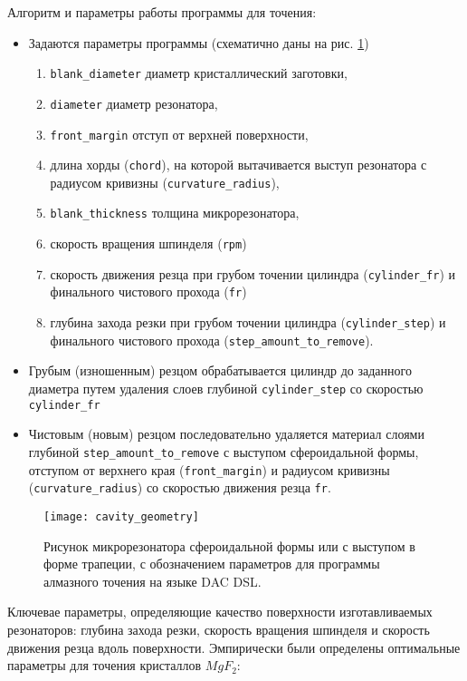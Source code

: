 Алгоритм и параметры работы программы для точения:
\begin{itemize}
  \item Задаются параметры программы (схематично даны на рис. \ref{cavity_scheme})
  \begin{enumerate}
    \item \texttt{blank\_diameter} диаметр кристаллический заготовки,
    \item \texttt{diameter} диаметр резонатора,
    \item \texttt{front\_margin} отступ от верхней поверхности,
    \item длина хорды (\texttt{chord}), на которой вытачивается выступ резонатора с радиусом кривизны (\texttt{curvature\_radius}),
    \item \texttt{blank\_thickness} толщина микрорезонатора,
    \item скорость вращения шпинделя (\texttt{rpm})
    \item скорость движения резца при грубом точении цилиндра (\texttt{cylinder\_fr}) и финального чистового прохода (\texttt{fr})
    \item глубина захода резки при грубом точении цилиндра (\texttt{cylinder\_step}) и финального чистового прохода (\texttt{step\_amount\_to\_remove}).
  \end{enumerate}
  \item Грубым (изношенным) резцом обрабатывается цилиндр до заданного диаметра путем удаления слоев глубиной \texttt{cylinder\_step} со скоростью \texttt{cylinder\_fr}
  \item Чистовым (новым) резцом последовательно удаляется материал слоями глубиной \texttt{step\_amount\_to\_remove} с выступом сфероидальной формы, отступом от верхнего края (\texttt{front\_margin}) и радиусом кривизны (\texttt{curvature\_radius}) со скоростью движения резца \texttt{fr}.
\end{itemize}

\begin{figure}[ht]
\centering
  \texttt{[image: cavity\_geometry]}
  \caption{Рисунок микрорезонатора сфероидальной формы или с выступом в форме трапеции, с обозначением параметров для программы алмазного точения на языке DAC DSL.}
  \label{cavity_scheme}
\end{figure}

Ключевае параметры, определяющие качество поверхности изготавливаемых резонаторов: глубина захода резки, скорость вращения шпинделя и скорость движения резца вдоль поверхности. Эмпирически были определены оптимальные параметры для точения кристаллов $MgF_2$:

